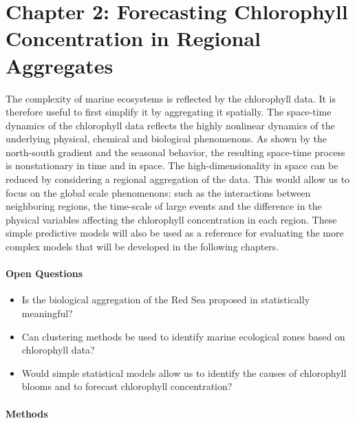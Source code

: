 \section{Chapter 2: Forecasting Chlorophyll Concentration in Regional
Aggregates}

The complexity of marine ecosystems is reflected by the chlorophyll data.  It
is therefore useful to first simplify it by aggregating it spatially. The
space-time dynamics of the chlorophyll data reflects the highly nonlinear
dynamics of the underlying physical, chemical and biological phenomenons. As
shown by the north-south gradient and the seasonal behavior, the resulting
space-time process is nonstationary in time and in space. The
high-dimensionality in space can be reduced by considering a regional
aggregation of the data. This would allow us to focus on the global scale
phenomenons: such as the interactions between neighboring regions, the
time-scale of large events and the difference in the physical variables
affecting the chlorophyll concentration in each region.  These simple
predictive models will also be used as a reference for evaluating the more
complex models that will be developed in the following chapters.

\paragraph{Open Questions}

\begin{itemize}

\item Is the biological aggregation of the Red Sea proposed in
\citep{Raitsos2013} statistically meaningful?

\item Can clustering methods be used to identify marine ecological zones based
on chlorophyll data?

\item Would simple statistical models allow us to identify the causes of
chlorophyll blooms and to forecast chlorophyll concentration?

\end{itemize}

\paragraph{Methods}

